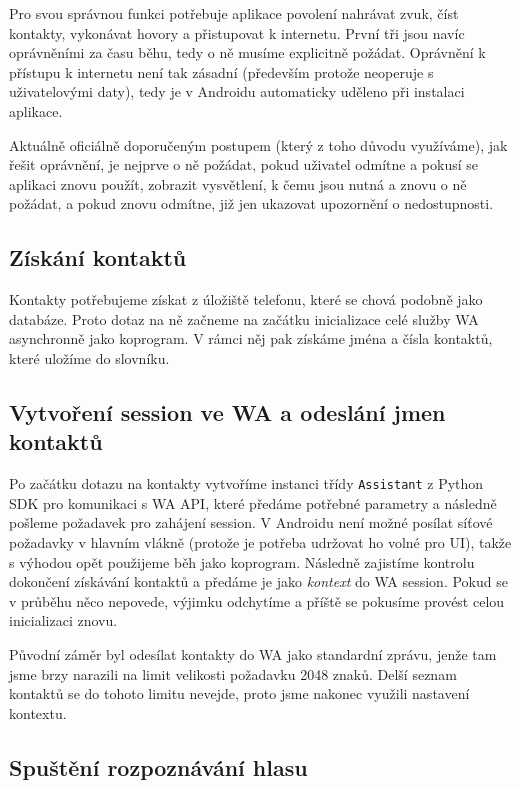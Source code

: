 Pro svou správnou funkci potřebuje aplikace povolení nahrávat zvuk, číst
kontakty, vykonávat hovory a přistupovat k internetu. První
tři jsou navíc oprávněními za času běhu, tedy o ně musíme explicitně
požádat. Oprávnění k přístupu k internetu není tak zásadní (především
protože neoperuje s uživatelovými daty), tedy je v Androidu automaticky
uděleno při instalaci aplikace.

Aktuálně oficiálně doporučeným postupem (který z toho důvodu využíváme), jak
řešit oprávnění, je nejprve o ně požádat, pokud uživatel odmítne a pokusí se
aplikaci znovu použít, zobrazit vysvětlení, k čemu jsou nutná a znovu o ně
požádat, a pokud znovu odmítne, již jen ukazovat upozornění o nedostupnosti.

\subsection{Získání kontaktů}

Kontakty potřebujeme získat z úložiště telefonu, které se chová podobně jako
databáze. Proto dotaz na ně začneme na začátku inicializace celé služby WA
asynchronně jako koprogram. V rámci něj pak získáme jména a čísla kontaktů,
které uložíme do slovníku.

\subsection{Vytvoření session ve WA a odeslání jmen kontaktů}

Po začátku dotazu na kontakty vytvoříme instanci třídy \texttt{Assistant}
z Python SDK
pro komunikaci s WA API, které předáme potřebné parametry a následně pošleme
požadavek pro zahájení session. V Androidu není možné posílat síťové požadavky
v hlavním vlákně (protože je potřeba udržovat ho volné pro UI), takže s výhodou
opět použijeme běh jako koprogram. Následně zajistíme
kontrolu dokončení získávání kontaktů a předáme je jako \textit{kontext} do
WA session. Pokud se v průběhu něco nepovede, výjimku odchytíme a příště
se pokusíme provést celou inicializaci znovu.

Původní záměr byl odesílat kontakty do WA jako standardní zprávu, jenže
tam jsme brzy narazili na limit velikosti požadavku 2048 znaků. Delší
seznam kontaktů se do tohoto limitu nevejde, proto jsme nakonec využili
nastavení kontextu.

\subsection{Spuštění rozpoznávání hlasu}

